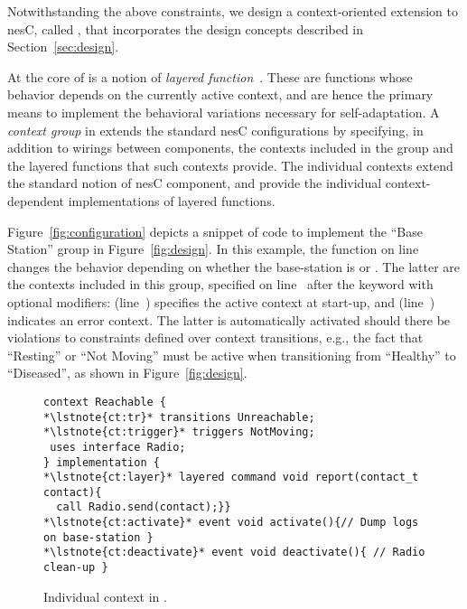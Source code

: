 \fakepar{\conesc} Notwithstanding the above constraints, we design a
context-oriented extension to nesC, called \conesc, that incorporates
the design concepts described in Section~\ref{sec:design}. 

At the core of \conesc is a notion of \emph{layered
  function}~\cite{Hirschfeld08}. These are functions whose behavior
depends on the currently active context, and are hence the primary
means to implement the behavioral variations necessary for
self-adaptation. A \emph{context group} in \conesc extends the
standard nesC configurations by specifying, in addition to wirings
between components, the contexts included in the group and the layered
functions that such contexts provide. The individual contexts extend
the standard notion of nesC component, and provide the individual
context-dependent implementations of layered functions.

Figure~\ref{fig:configuration} depicts a snippet of \conesc code to
implement the ``Base Station'' group in Figure~\ref{fig:design}. In
this example, the  function on line~
changes the behavior depending on whether the base-station is
 or . The latter are the contexts
included in this group, specified on line~ after the
keyword  with optional modifiers: 
(line~) specifies the active context at start-up, and
 (line~) indicates an error
context. The latter is automatically activated should there be
violations to constraints defined over context transitions, e.g., the
fact that ``Resting'' or ``Not Moving'' must be active when transitioning from
``Healthy'' to ``Diseased'', as shown in Figure~\ref{fig:design}.

\begin{figure}[!tb]
\begin{lstlisting}[style=conescframe]
context Reachable {
*\lstnote{ct:tr}* transitions Unreachable;
*\lstnote{ct:trigger}* triggers NotMoving;
 uses interface Radio;
} implementation {
*\lstnote{ct:layer}* layered command void report(contact_t contact){
  call Radio.send(contact);}}
*\lstnote{ct:activate}* event void activate(){// Dump logs on base-station }
*\lstnote{ct:deactivate}* event void deactivate(){ // Radio clean-up }
\end{lstlisting}
\vspace{-4mm}
\caption{Individual context in \conesc.}
  \label{fig:context}
\vspace{-4mm}
\end{figure}

